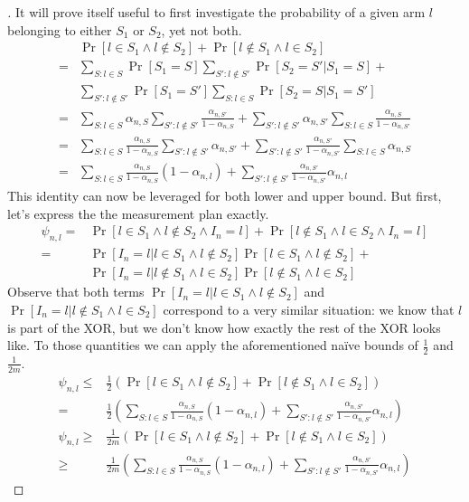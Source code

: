 \begin{proof}[]
  It will prove itself useful to first investigate the probability of a given arm $l$ belonging to either $S_1$ or $S_2$, yet not both.
  \begin{align}
    &\Pr[l \in S_1 \wedge l \notin S_2] + \Pr[l \notin S_1 \wedge l \in S_2]  \\
    =& \sum_{S: l \in S} \Pr[S_1 = S] \sum_{S': l \notin S'} \Pr[S_2 = S' | S_1 = S] + \\
    & \sum_{S': l \notin S'} \Pr[S_1 = S'] \sum_{S: l \in S} \Pr[S_2 = S | S_1 = S'] \\
    =& \sum_{S: l \in S} \alpha_{n, S} \sum_{S': l \notin S'} \frac{\alpha_{n, S'}}{1 - \alpha_{n, S}} + \sum_{S': l \notin S'} \alpha_{n, S'} \sum_{S: l \in S} \frac{\alpha_{n, S}}{1 - \alpha_{n, S'}}\\
    =& \sum_{S: l \in S} \frac{\alpha_{n, S}}{1 - \alpha_{n, S}} \sum_{S': l \notin S'} \alpha_{n, S'} + \sum_{S': l \notin S'} \frac{\alpha_{n, S'}}{1 - \alpha_{n, S'}} \sum_{S: l \in S} \alpha_{n, S}\\
    =& \sum_{S: l \in S} \frac{\alpha_{n, S}}{1 - \alpha_{n, S}} (1 - \alpha_{n, l}) +  \sum_{S': l \notin S'} \frac{\alpha_{n, S'}}{1 - \alpha_{n, S'}} \alpha_{n, l}
  \end{align}
  This identity can now be leveraged for both lower and upper bound. But first, let's express the the measurement plan exactly.
  \begin{align}
    \psi_{n, l} =& \Pr[l \in S_1 \wedge l \notin S_2 \wedge I_n = l] + \Pr[l \notin S_1 \wedge l \in S_2 \wedge I_n = l] \\
    =& \Pr[I_n = l | l \in S_1 \wedge l \notin S_2] \Pr[l \in S_1 \wedge l \notin S_2] + \\
    & \Pr[I_n = l | l \notin S_1 \wedge l \in S_2] \Pr[l \notin S_1 \wedge l \in S_2]
  \end{align}
  Observe that both terms $\Pr[I_n = l | l \in S_1 \wedge l \notin S_2]$ and $\Pr[I_n = l | l \notin S_1 \wedge l \in S_2]$ correspond to a very similar situation: we know that $l$ is part of the XOR, but we don't know how exactly the rest of the XOR looks like. To those quantities we can apply the aforementioned naïve bounds of $\frac{1}{2}$ and $\frac{1}{2m}$.
  \begin{align}
    \psi_{n, l} \leq& \frac{1}{2} (\Pr[l \in S_1 \wedge l \notin S_2] + \Pr[l \notin S_1 \wedge l \in S_2]) \\
    =& \frac{1}{2}(\sum_{S: l \in S} \frac{\alpha_{n, S}}{1 - \alpha_{n, S}} (1 - \alpha_{n, l}) +  \sum_{S': l \notin S'} \frac{\alpha_{n, S'}}{1 - \alpha_{n, S'}} \alpha_{n, l}) \\
    \psi_{n, l} \geq& \frac{1}{2m} (\Pr[l \in S_1 \wedge l \notin S_2] + \Pr[l \notin S_1 \wedge l \in S_2]) \\
    \geq& \frac{1}{2m}(\sum_{S: l \in S} \frac{\alpha_{n, S}}{1 - \alpha_{n, S}} (1 - \alpha_{n, l}) +  \sum_{S': l \notin S'} \frac{\alpha_{n, S'}}{1 - \alpha_{n, S'}} \alpha_{n, l})
  \end{align}
\end{proof}

